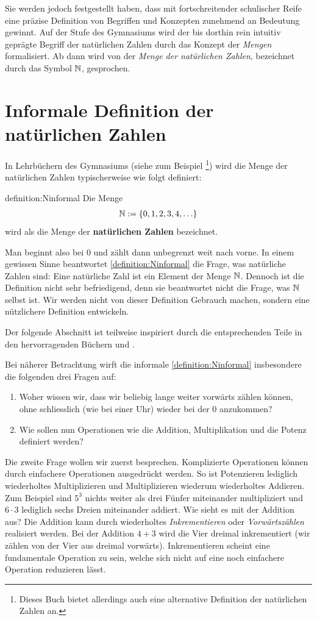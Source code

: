Sie werden jedoch festgestellt haben, dass mit fortschreitender schulischer Reife eine präzise Definition von Begriffen und Konzepten zunehmend an Bedeutung gewinnt. Auf der Stufe des Gymnasiums wird der bis dorthin rein intuitiv geprägte Begriff der natürlichen Zahlen durch das Konzept der \textit{Mengen} formalisiert. Ab dann wird von der \textit{Menge der natürlichen Zahlen}, bezeichnet durch das Symbol $\mathbb{N}$, gesprochen.

\section{Informale Definition der natürlichen Zahlen}
In Lehrbüchern des Gymnasiums (siehe zum Beispiel \cite{ArminBarth}\footnote{Dieses Buch bietet allerdings auch eine alternative Definition der natürlichen Zahlen an.}) wird die Menge der natürlichen Zahlen typischerweise wie folgt definiert:
\begin{definition}{definition:Ninformal}
Die Menge
\begin{align*}
    \mathbb{N} := \left\{0,1,2,3,4,\ldots\right\}
\end{align*}
wird als die Menge der \textbf{natürlichen Zahlen} bezeichnet.
\end{definition}
Man beginnt also bei $0$ und zählt dann unbegrenzt weit nach vorne. In einem gewissen Sinne beantwortet \cref{definition:Ninformal} die Frage, was natürliche Zahlen sind: Eine natürliche Zahl ist ein Element der Menge $\mathbb{N}$. Dennoch ist die Definition nicht sehr befriedigend, denn sie beantwortet nicht die Frage, was $\mathbb{N}$ selbst ist. \cite{TerenceTao} Wir werden nicht von dieser Definition Gebrauch machen, sondern eine nützlichere Definition entwickeln. 

Der folgende Abschnitt ist teilweise inspiriert durch die entsprechenden Teile in den hervorragenden Büchern \cite{TerenceTao} und \cite{AmannEscher1}.

Bei näherer Betrachtung wirft die informale \cref{definition:Ninformal} insbesondere die folgenden drei Fragen auf:
\begin{enumerate}
    \item Woher wissen wir, dass wir beliebig lange weiter vorwärts zählen können, ohne schliesslich (wie bei einer Uhr) wieder bei der $0$ anzukommen?
    \item Wie sollen nun Operationen wie die Addition, Multiplikation und die Potenz definiert werden?
\end{enumerate}
Die zweite Frage wollen wir zuerst besprechen. Komplizierte Operationen können durch einfachere Operationen ausgedrückt werden. So ist Potenzieren lediglich wiederholtes Multiplizieren und Multiplizieren wiederum wiederholtes Addieren. Zum Beispiel sind $5^3$ nichts weiter als drei Fünfer miteinander multipliziert und $6\cdot 3$ lediglich sechs Dreien miteinander addiert. Wie sieht es mit der Addition aus? Die Addition kann durch wiederholtes \textit{Inkrementieren} oder \textit{Vorwärtszählen} realisiert werden. Bei der Addition $4+3$ wird die Vier dreimal inkrementiert (wir zählen von der Vier aus dreimal vorwärts). Inkrementieren scheint eine fundamentale Operation zu sein, welche sich nicht auf eine noch einfachere Operation reduzieren lässt.

